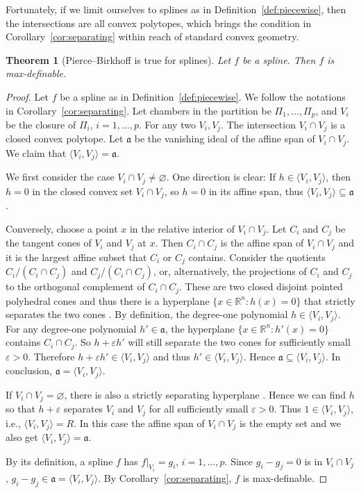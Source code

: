 \documentclass[11pt]{amsart}
\theoremstyle{plain}
\newtheorem{theorem}{Theorem}[section]
\theoremstyle{definition}
\begin{document}
Fortunately, if we limit ourselves to splines as in Definition~\ref{def:piecewise}, then the intersections are all convex polytopes, which brings the condition in Corollary~\ref{cor:separating} within reach of standard convex geometry.
\begin{theorem}[Pierce--Birkhoff is true for splines]\label{thm:PBlinear1}
Let $f$ be a spline. Then $f$ is max-definable.
\end{theorem}
\begin{proof}
Let $f$ be a spline as in Definition~\ref{def:piecewise}. We follow the notations in Corollary~\ref{cor:separating}. Let chambers in the partition be $\Pi_1,\dots,\Pi_p$, and $V_i $ be the closure of $\Pi_i$, $i =1,\dots,p$. For any two $V_i, V_j$. The intersection $V_i \cap V_j$ is a closed convex polytope. Let $\mathfrak{a}$ be the vanishing ideal of the affine span of $V_i \cap V_j$. We claim that $\langle V_i, V_j\rangle = \mathfrak{a}$. 

We first consider the case $V_i \cap V_j \neq \varnothing$. One direction is clear: If $h \in \langle V_i, V_j\rangle$, then $h = 0$ in the closed convex set $V_i \cap V_j$, so $h = 0$ in its affine span, thus $\langle V_i, V_j\rangle \subseteq \mathfrak{a}$. 

Conversely, choose a point $x$ in the relative interior of $V_i \cap V_j$. Let $C_i$ and $C_j$ be the tangent cones of $V_i$ and $V_j$ at $x$. Then $C_i \cap C_j$ is the affine span of $V_i \cap V_j$ and it is the largest affine subset that $C_i$ or $C_j$ contains. Consider the quotients $C_i/(C_i\cap C_j)$ and $C_j/(C_i\cap C_j)$, or, alternatively, the projections of $C_i$ and $C_j$ to the orthogonal complement of $C_i\cap C_j$. These are two closed disjoint pointed polyhedral cones and thus there is a hyperplane $\{x \in \mathbb{R}^n : h(x) = 0 \}$ that strictly separates the two cones \cite{Klee1955}. By definition, the degree-one polynomial $h \in \langle V_i, V_j\rangle$. For any degree-one polynomial $h' \in \mathfrak{a}$, the hyperplane $\{ x  \in \mathbb{R}^n : h'(x) = 0 \}$ contains $C_i \cap C_j$. So $h + \varepsilon h'$ will still separate the two cones for sufficiently small $\varepsilon > 0$. Therefore $h + \varepsilon h' \in \langle V_i, V_j\rangle$ and thus $h' \in \langle V_i, V_j\rangle$. Hence $\mathfrak{a} \subseteq \langle V_i, V_j\rangle$. In conclusion, $\mathfrak{a} = \langle V_i, V_j\rangle$.

If $V_i \cap V_j = \varnothing$, there is also a strictly separating hyperplane \cite[Theorem~1.1.10]{stoer2012}. Hence we can find $h$ so that $h + \varepsilon$ separates $V_i$ and $V_j$ for all sufficiently small $\varepsilon > 0$. Thus $1 \in \langle V_i, V_j\rangle$, i.e., $\langle V_i, V_j\rangle = R$. In this case the affine span of $V_i \cap V_j$ is the empty set and we also get $\langle V_i, V_j\rangle = \mathfrak{a}$.

By its definition, a spline $f$ has $f\rvert_{V_i} = g_i$, $i=1,\dots,p$. Since $g_i - g_j = 0$ is in $V_i \cap V_j$, $g_i-g_j \in \mathfrak{a} = \langle V_i, V_j\rangle$.  By Corollary~\ref{cor:separating}, $f$ is max-definable.
\end{proof}
\end{document}
